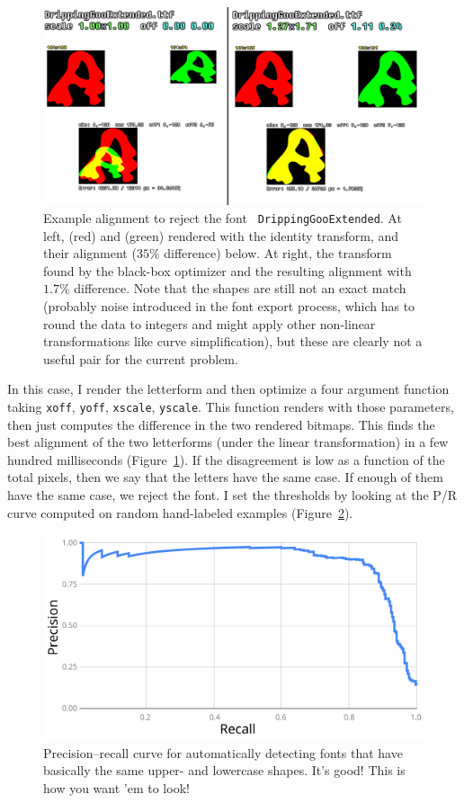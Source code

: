 \documentclass[twocolumn]{article}
\begin{document}
\begin{figure}[tp]
\centering
  \includegraphics[width=0.9 \linewidth]{casealignment}
\caption{ Example alignment to reject the font {\tt
    DrippingGooExtended}. At left,  (red) and
   (green) rendered with the identity transform, and
  their alignment ($35\%$ difference) below. At right, the transform
  found by the black-box optimizer and the resulting alignment with
  $1.7\%$ difference. Note that the shapes are still not an exact
  match (probably noise introduced in the font export process, which
  has to round the data to integers and might apply other non-linear
  transformations like curve simplification), but these are clearly
  not a useful pair for the current
  problem.} \label{fig:casealignment}
\end{figure}

In this case, I render the letterform  and then optimize
a four argument function taking {\tt xoff}, {\tt yoff}, {\tt xscale},
{\tt yscale}. This function renders  with those
parameters, then just computes the difference in the two rendered
bitmaps. This finds the best alignment of the two letterforms (under
the linear transformation) in a few hundred milliseconds
(Figure~\ref{fig:casealignment}). If the disagreement is low as a
function of the total pixels, then we say that the letters have the
same case. If enough of them have the same case, we reject the font. I
set the thresholds by looking at the P/R curve computed on random
hand-labeled examples (Figure~\ref{fig:samecasepr}).

\begin{figure}[ht]
\centering
  \includegraphics[width=0.9 \linewidth]{samecasepr}
\caption{ Precision--recall curve for automatically detecting fonts
  that have basically the same upper- and lowercase shapes. It's good!
  This is how you want 'em to look!
} \label{fig:samecasepr}
\end{figure}
\end{document}
